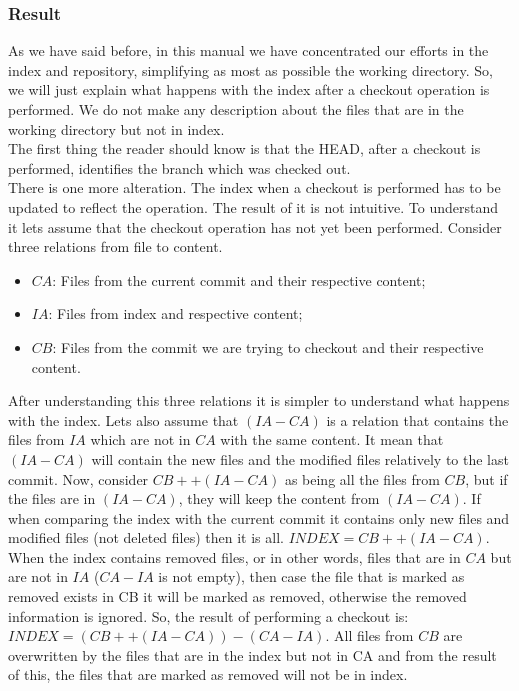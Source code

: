 \subsubsection{Result}
As we have said before, in this manual we have
concentrated our efforts in the index and repository, simplifying as
most as possible the working directory. So, we will just explain what
happens with the index after a checkout operation is performed. We do
not make any description about the files that are in the working directory
but not in index.\\

The first thing the reader should know is that the
HEAD, after a checkout is performed, identifies the branch which was
checked out.\\

There is one more alteration. The index when a checkout is performed
has to be updated to reflect the operation. The result of it is not intuitive. To
understand it lets assume that the checkout operation has not yet been 
performed. Consider three relations from file to content. 
\begin{itemize}
   \item $CA$: Files from the current commit and their
   respective content;
   \item $IA$: Files from index and respective content;
   \item $CB$: Files from the commit we are trying to checkout
   and their respective content.
\end{itemize}
After understanding this three relations it is simpler to understand
what happens with the index. Lets also assume that $(IA-CA)$ is a relation that
contains the files from $IA$ which are not in $CA$ with the same content.
It mean that $(IA-CA)$ will contain the new files and the modified files relatively to
the last commit. Now, consider $CB ++ (IA-CA)$ as being all the files
from $CB$, but if the files are in $(IA-CA)$, they will keep the
content from $(IA-CA)$. If when comparing the index with the current
commit it contains only new files and modified files (not deleted
files) then it is all. $INDEX = CB ++ (IA-CA)$. When the index
contains removed files, or in other words, files that are in $CA$ but are not in
$IA$ ($CA-IA$ is not empty), then case the file that is marked as removed exists
in CB it will be marked as removed, otherwise the removed information is
ignored. So, the result of performing a checkout is: $INDEX = (CB ++
(IA-CA)) - (CA-IA)$. All files from $CB$ are overwritten by the files
that are in the index but not in CA and from the result of this, the
files that are marked as removed will not be in index.

